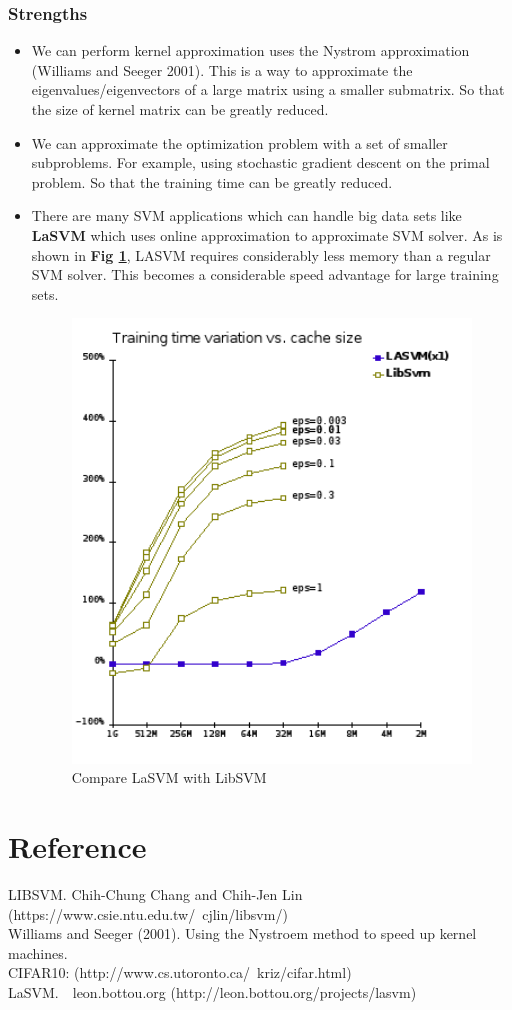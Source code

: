 \documentclass{article}
\theoremstyle{definition}
\numberwithin{equation}{section}
\numberwithin{figure}{section}
\begin{document}
  \subsubsection{Strengths}
  \begin{itemize}
  \item We can perform kernel approximation uses the Nystrom approximation (Williams and Seeger 2001). This is a way to approximate the eigenvalues/eigenvectors of a large matrix using a smaller submatrix. So that the size of kernel matrix can be greatly reduced. 
  \item We can approximate the optimization problem with a set of smaller subproblems. For example, using stochastic gradient descent on the primal problem. So that the training time can be greatly reduced.
  \item There are many SVM applications which can handle big data sets like \textbf{LaSVM} which uses online approximation to approximate SVM solver. As is shown in \textbf{Fig \ref{Lasvm}}, LASVM requires considerably less memory than a regular SVM solver. This becomes a considerable speed advantage for large training sets. 
  \begin{figure}[htbp]
    	\centering
    	\includegraphics[width=12cm]{fig/lasvm.png}
    \caption{Compare LaSVM with LibSVM}
    \label{Lasvm}
    \end{figure}
  \end{itemize}
  
  
  \section{Reference}
  LIBSVM. Chih-Chung Chang and Chih-Jen Lin (https://www.csie.ntu.edu.tw/~cjlin/libsvm/)\\
  Williams and Seeger (2001). Using the Nystroem method to speed up kernel machines.\\
  CIFAR10: (http://www.cs.utoronto.ca/~kriz/cifar.html)\\
  LaSVM.　leon.bottou.org (http://leon.bottou.org/projects/lasvm)
 
\end{document}
